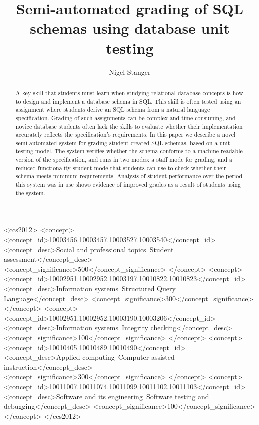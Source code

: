 \documentclass[sigconf, authordraft, capitalise]{acmart}
\title{Semi-automated grading of SQL \\ schemas using database unit testing}
\author{Nigel Stanger}
\affiliation{
    \institution{University of Otago}
    \department{Department of Information Science}
    \city{Dunedin}
    \country{New Zealand}
}
\begin{document}
\begin{abstract}
    A key skill that students must learn when studying relational database concepts is how to design and implement a database schema in SQL. This skill is often tested using an assignment where students derive an SQL schema from a natural language specification. Grading of such assignments can be complex and time-consuming, and novice database students often lack the skills to evaluate whether their implementation accurately reflects the specification's requirements. In this paper we describe a novel semi-automated system for grading student-created SQL schemas, based on a unit testing model. The system verifies whether the schema conforms to a machine-readable version of the specification, and runs in two modes: a staff mode for grading, and a reduced functionality student mode that students can use to check whether their schema meets minimum requirements. Analysis of student performance over the period this system was in use shows evidence of improved grades as a result of students using the system.
\end{abstract}

\begin{CCSXML}
<ccs2012>
<concept>
<concept_id>10003456.10003457.10003527.10003540</concept_id>
<concept_desc>Social and professional topics~Student assessment</concept_desc>
<concept_significance>500</concept_significance>
</concept>
<concept>
<concept_id>10002951.10002952.10003197.10010822.10010823</concept_id>
<concept_desc>Information systems~Structured Query Language</concept_desc>
<concept_significance>300</concept_significance>
</concept>
<concept>
<concept_id>10002951.10002952.10003190.10003206</concept_id>
<concept_desc>Information systems~Integrity checking</concept_desc>
<concept_significance>100</concept_significance>
</concept>
<concept>
<concept_id>10010405.10010489.10010490</concept_id>
<concept_desc>Applied computing~Computer-assisted instruction</concept_desc>
<concept_significance>300</concept_significance>
</concept>
<concept>
<concept_id>10011007.10011074.10011099.10011102.10011103</concept_id>
<concept_desc>Software and its engineering~Software testing and debugging</concept_desc>
<concept_significance>100</concept_significance>
</concept>
</ccs2012>
\end{CCSXML}

\end{document}
